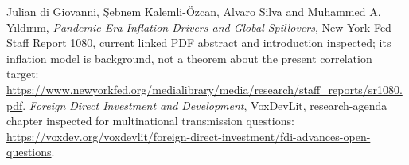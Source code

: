 \documentclass[11pt]{article}
\begin{document}
Julian di Giovanni, \c{S}ebnem Kalemli-\"Ozcan, Alvaro Silva and Muhammed A. Y\i ld\i r\i m, \emph{Pandemic-Era Inflation Drivers and Global Spillovers}, New York Fed Staff Report 1080, current linked PDF abstract and introduction inspected; its inflation model is background, not a theorem about the present correlation target:
\url{https://www.newyorkfed.org/medialibrary/media/research/staff_reports/sr1080.pdf}.
\emph{Foreign Direct Investment and Development}, VoxDevLit, research-agenda chapter inspected for multinational transmission questions:
\url{https://voxdev.org/voxdevlit/foreign-direct-investment/fdi-advances-open-questions}.
\end{document}
